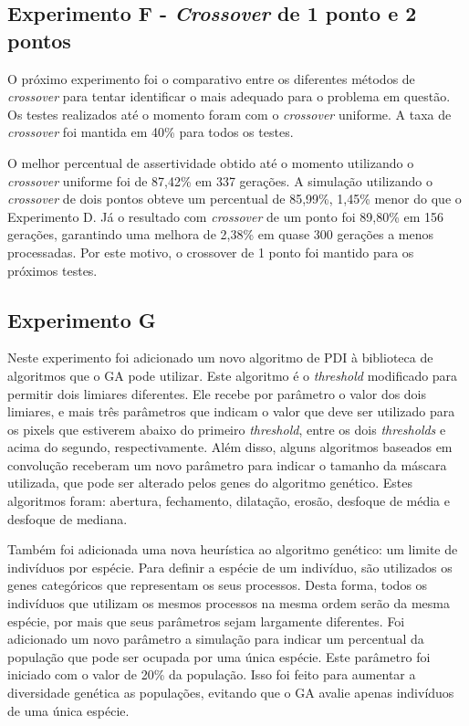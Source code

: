 \documentclass[12pt,oneside,a4paper,english,french,spanish,brazil,]{abntex2}
\begin{document}
\subsection{Experimento F - \textit{Crossover} de 1 ponto e 2 pontos}

O próximo experimento foi o comparativo entre os diferentes métodos de \textit{crossover} para tentar identificar o mais adequado para o problema em questão. Os testes realizados até o momento foram com o \textit{crossover} uniforme. A taxa de \textit{crossover} foi mantida em 40\% para todos os testes.

O melhor percentual de assertividade obtido até o momento utilizando o \textit{crossover} uniforme foi de 87,42\% em 337 gerações. A simulação utilizando o \textit{crossover} de dois pontos obteve um percentual de 85,99\%, 1,45\% menor do que o Experimento D. Já o resultado com \textit{crossover} de um ponto foi 89,80\% em 156 gerações, garantindo uma melhora de 2,38\% em quase 300 gerações a menos processadas. Por este motivo, o crossover de 1 ponto foi mantido para os próximos testes.

\subsection{Experimento G}

Neste experimento foi adicionado um novo algoritmo de PDI à biblioteca de algoritmos que o GA pode utilizar. Este algoritmo é o \textit{threshold} modificado para permitir dois limiares diferentes. Ele recebe por parâmetro o valor dos dois limiares, e mais três parâmetros que indicam o valor que deve ser utilizado para os pixels que estiverem abaixo do primeiro \textit{threshold}, entre os dois \textit{thresholds} e acima do segundo, respectivamente. Além disso, alguns algoritmos baseados em convolução receberam um novo parâmetro para indicar o tamanho da máscara utilizada, que pode ser alterado pelos genes do algoritmo genético. Estes algoritmos foram: abertura, fechamento, dilatação, erosão, desfoque de média e desfoque de mediana.

Também foi adicionada uma nova heurística ao algoritmo genético: um limite de indivíduos por espécie. Para definir a espécie de um indivíduo, são utilizados os genes categóricos que representam os seus processos. Desta forma, todos os indivíduos que utilizam os mesmos processos na mesma ordem serão da mesma espécie, por mais que seus parâmetros sejam largamente diferentes. Foi adicionado um novo parâmetro a simulação para indicar um percentual da população que pode ser ocupada por uma única espécie. Este parâmetro foi iniciado com o valor de 20\% da população. Isso foi feito para aumentar a diversidade genética as populações, evitando que o GA avalie apenas indivíduos de uma única espécie.
\end{document}
